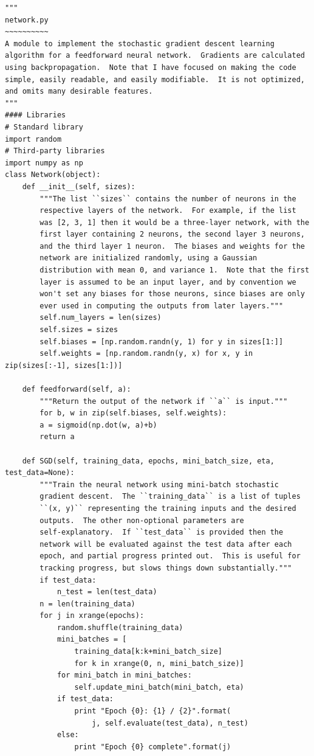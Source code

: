 \documentclass[a4paper,twoside,10pt]{book}
\begin{document}
\begin{lstlisting}
"""
network.py
~~~~~~~~~~
A module to implement the stochastic gradient descent learning
algorithm for a feedforward neural network.  Gradients are calculated
using backpropagation.  Note that I have focused on making the code
simple, easily readable, and easily modifiable.  It is not optimized,
and omits many desirable features.
"""
#### Libraries
# Standard library
import random
# Third-party libraries
import numpy as np
class Network(object):
	def __init__(self, sizes):
		"""The list ``sizes`` contains the number of neurons in the
		respective layers of the network.  For example, if the list
		was [2, 3, 1] then it would be a three-layer network, with the
		first layer containing 2 neurons, the second layer 3 neurons,
		and the third layer 1 neuron.  The biases and weights for the
		network are initialized randomly, using a Gaussian
		distribution with mean 0, and variance 1.  Note that the first
		layer is assumed to be an input layer, and by convention we
		won't set any biases for those neurons, since biases are only
		ever used in computing the outputs from later layers."""
		self.num_layers = len(sizes)
		self.sizes = sizes
		self.biases = [np.random.randn(y, 1) for y in sizes[1:]]
		self.weights = [np.random.randn(y, x) for x, y in zip(sizes[:-1], sizes[1:])]
	
	def feedforward(self, a):
		"""Return the output of the network if ``a`` is input."""
		for b, w in zip(self.biases, self.weights):
		a = sigmoid(np.dot(w, a)+b)
		return a
	
	def SGD(self, training_data, epochs, mini_batch_size, eta, test_data=None):
		"""Train the neural network using mini-batch stochastic
		gradient descent.  The ``training_data`` is a list of tuples
		``(x, y)`` representing the training inputs and the desired
		outputs.  The other non-optional parameters are
		self-explanatory.  If ``test_data`` is provided then the
		network will be evaluated against the test data after each
		epoch, and partial progress printed out.  This is useful for
		tracking progress, but slows things down substantially."""
		if test_data:
			n_test = len(test_data)
		n = len(training_data)
		for j in xrange(epochs):
			random.shuffle(training_data)
			mini_batches = [
				training_data[k:k+mini_batch_size]
				for k in xrange(0, n, mini_batch_size)]
			for mini_batch in mini_batches:
				self.update_mini_batch(mini_batch, eta)
			if test_data:
				print "Epoch {0}: {1} / {2}".format(
					j, self.evaluate(test_data), n_test)
			else:
				print "Epoch {0} complete".format(j)
	

\end{lstlisting}
\end{document}
